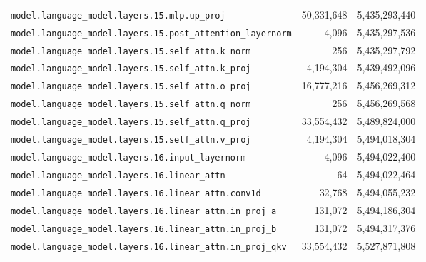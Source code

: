 \documentclass[10pt,a4paper]{article}
\theoremstyle{definition}
\begin{document}
\begin{appendices}
\begin{longtable}{p{9.5cm}rr}
\texttt{model.\allowbreak{}language\_model.\allowbreak{}layers.\allowbreak{}15.\allowbreak{}mlp.\allowbreak{}up\_proj} & 50,331,648 & 5,435,293,440 \\
\texttt{model.\allowbreak{}language\_model.\allowbreak{}layers.\allowbreak{}15.\allowbreak{}post\_attention\_layernorm} & 4,096 & 5,435,297,536 \\
\texttt{model.\allowbreak{}language\_model.\allowbreak{}layers.\allowbreak{}15.\allowbreak{}self\_attn.\allowbreak{}k\_norm} & 256 & 5,435,297,792 \\
\texttt{model.\allowbreak{}language\_model.\allowbreak{}layers.\allowbreak{}15.\allowbreak{}self\_attn.\allowbreak{}k\_proj} & 4,194,304 & 5,439,492,096 \\
\texttt{model.\allowbreak{}language\_model.\allowbreak{}layers.\allowbreak{}15.\allowbreak{}self\_attn.\allowbreak{}o\_proj} & 16,777,216 & 5,456,269,312 \\
\texttt{model.\allowbreak{}language\_model.\allowbreak{}layers.\allowbreak{}15.\allowbreak{}self\_attn.\allowbreak{}q\_norm} & 256 & 5,456,269,568 \\
\texttt{model.\allowbreak{}language\_model.\allowbreak{}layers.\allowbreak{}15.\allowbreak{}self\_attn.\allowbreak{}q\_proj} & 33,554,432 & 5,489,824,000 \\
\texttt{model.\allowbreak{}language\_model.\allowbreak{}layers.\allowbreak{}15.\allowbreak{}self\_attn.\allowbreak{}v\_proj} & 4,194,304 & 5,494,018,304 \\
\texttt{model.\allowbreak{}language\_model.\allowbreak{}layers.\allowbreak{}16.\allowbreak{}input\_layernorm} & 4,096 & 5,494,022,400 \\
\texttt{model.\allowbreak{}language\_model.\allowbreak{}layers.\allowbreak{}16.\allowbreak{}linear\_attn} & 64 & 5,494,022,464 \\
\texttt{model.\allowbreak{}language\_model.\allowbreak{}layers.\allowbreak{}16.\allowbreak{}linear\_attn.\allowbreak{}conv1d} & 32,768 & 5,494,055,232 \\
\texttt{model.\allowbreak{}language\_model.\allowbreak{}layers.\allowbreak{}16.\allowbreak{}linear\_attn.\allowbreak{}in\_proj\_a} & 131,072 & 5,494,186,304 \\
\texttt{model.\allowbreak{}language\_model.\allowbreak{}layers.\allowbreak{}16.\allowbreak{}linear\_attn.\allowbreak{}in\_proj\_b} & 131,072 & 5,494,317,376 \\
\texttt{model.\allowbreak{}language\_model.\allowbreak{}layers.\allowbreak{}16.\allowbreak{}linear\_attn.\allowbreak{}in\_proj\_qkv} & 33,554,432 & 5,527,871,808 \\

\end{longtable}
\end{appendices}
\end{document}
